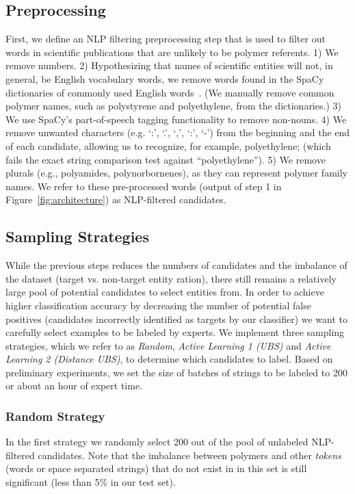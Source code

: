 \subsection{Preprocessing}
First, we define an
NLP filtering preprocessing step that is used to filter out
words in scientific publications that are unlikely to be polymer referents. 1) We remove numbers. 2)
Hypothesizing that names of scientific entities will not, in general, be English
vocabulary words, we remove words found in the SpaCy dictionaries
of commonly used English words~\cite{choi2015depends}. (We manually remove common polymer
names, such as polystyrene and polyethylene, from the dictionaries.) 3) We use
SpaCy's part-of-speech tagging functionality to remove non-nouns. 4) We remove
unwanted characters (e.g. `:', `.', `,', `:', `-') from the beginning and the end of each
candidate, allowing us to recognize, for example, polyethylene; (which fails the
exact string comparison test against ``polyethylene''). 5) We remove plurals (e.g.,
polyamides, polynorbornenes), as they can represent polymer family names.
We refer to these pre-processed words (output of step 1 in Figure~\ref{fig:architecture}) as NLP-filtered candidates.


\subsection{Sampling Strategies}
While the previous steps reduces the numbers of candidates and the imbalance of the dataset (target vs. non-target entity ration), there still remains a relatively large pool of potential candidates to select entities from.
In order to achieve higher classification accuracy\textemdash
by decreasing the number of potential false positives (candidates incorrectly identified as targets by our classifier)
\textemdash we want to carefully select examples to be labeled by experts.
We implement three sampling strategies, which we refer to as \textit{Random}, \textit{Active Learning 1 (UBS)} and \textit{Active Learning 2 (Distance UBS)}, 
to determine which candidates to label.
Based on preliminary experiments, we set the size of batches of strings to be labeled to 200 or about an hour of expert time.

\subsubsection{Random Strategy}
In the first strategy we randomly select 200 out of the pool of unlabeled NLP-filtered candidates.
Note that the imbalance between polymers and other \textit{tokens} (words or space separated strings) that 
do not exist in in this set is still significant (less than 5\% in our test set).

